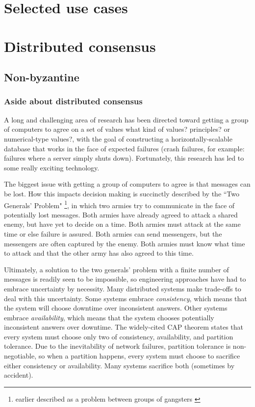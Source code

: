 \documentclass[a4paper,10pt]{article} \usepackage[utf8]{inputenc}
\newcommand{\bs}[1]{{\color{red}#1}}
\begin{document}
\section{Selected use cases}





\section{Distributed consensus}

\subsection{Non-byzantine}

\subsubsection{Aside about distributed consensus}

A long and challenging area of research has been directed toward getting a
group of computers to agree on a set of values
\bs{what kind of values? principles? or numerical-type values?},
with the goal of constructing a
horizontally-scalable database that works in the face of expected failures
(crash failures, for example: failures where a server simply shuts down).
Fortunately, this research has led to some really exciting technology.

The biggest issue with getting a group of computers to agree is that messages
can be lost. How this impacts decision making is succinctly described by the
``Two Generals' Problem" \cite{two-generals} \footnote{earlier described as a problem
between groups of gangsters \cite{two-gangsters}}, in which two armies try to
communicate in the face of potentially lost messages. Both armies have already
agreed to attack a shared enemy, but have yet to decide on a time. Both armies
must attack at the same time or else failure is assured. Both armies can send
messengers, but the messengers are often captured by the enemy. Both armies must
know what time to attack and that the other army has also agreed to this time.

Ultimately, a solution to the two generals' problem with a finite number of
messages is readily seen to be impossible, so engineering approaches have had
to embrace uncertainty by necessity. Many distributed systems make trade-offs to
deal with this uncertainty. Some systems embrace {\em consistency}, which means
that the system will choose downtime over inconsistent answers. Other
systems embrace {\em availability}, which means that the system chooses
potentially inconsistent answers over downtime. The widely-cited CAP
theorem \cite{cap} states that every system must choose only two of consistency,
availability, and partition tolerance. Due to the inevitability of network
failures, partition tolerance is non-negotiable, so when a partition happens,
every system must choose to sacrifice either consistency or availability. Many
systems sacrifice both (sometimes by accident).
\end{document}
